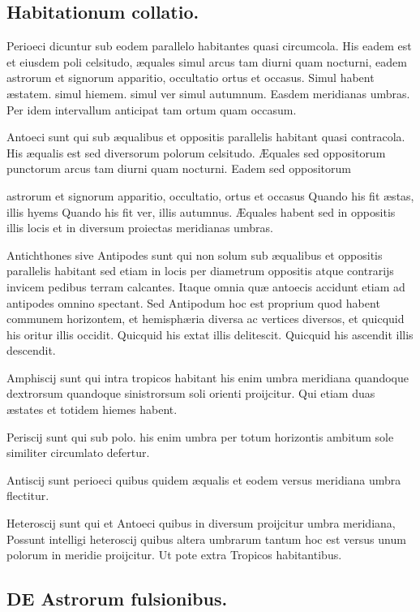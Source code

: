 \documentclass[11pt,a4paper]{article}
\begin{document}
\subsection*{Habitationum collatio.}

Perioeci dicuntur sub eodem parallelo habitantes quasi circumcola. His eadem est et eiusdem poli celsitudo, æquales simul arcus tam diurni quam nocturni, eadem astrorum et signorum apparitio, occultatio ortus et occasus. Simul habent æstatem. simul hiemem. simul ver simul autumnum. Easdem meridianas umbras. Per idem intervallum anticipat tam ortum quam occasum.

Antoeci sunt qui sub æqualibus et oppositis parallelis habitant quasi contracola. His æqualis est sed diversorum polorum celsitudo. Æquales sed oppositorum punctorum arcus tam diurni quam nocturni. Eadem sed oppositorum

astrorum et signorum apparitio, occultatio, ortus et occasus Quando his fit æstas, illis hyems Quando his fit ver, illis autumnus. Æquales habent sed in oppositis illis locis et in diversum proiectas meridianas umbras.

Antichthones sive Antipodes sunt qui non solum sub æqualibus et oppositis parallelis habitant sed etiam in locis per diametrum oppositis atque contrarijs invicem pedibus terram calcantes. Itaque omnia quæ antoecis accidunt etiam ad antipodes omnino spectant. Sed Antipodum hoc est proprium quod habent communem horizontem, et hemisphæria diversa ac vertices diversos, et quicquid his oritur illis occidit. Quicquid his extat illis delitescit. Quicquid his ascendit illis descendit.

Amphiscij sunt qui intra tropicos habitant his enim umbra meridiana quandoque dextrorsum quandoque sinistrorsum soli orienti proijcitur. Qui etiam duas æstates et totidem hiemes habent.

Periscij sunt qui sub polo. his enim umbra per totum horizontis ambitum sole similiter circumlato defertur.

Antiscij sunt perioeci quibus quidem æqualis et eodem versus meridiana umbra flectitur.

Heteroscij sunt qui et Antoeci quibus in diversum proijcitur umbra meridiana, Possunt intelligi heteroscij quibus altera umbrarum tantum hoc est versus unum polorum in meridie proijcitur. Ut pote extra Tropicos habitantibus.

\subsection*{DE Astrorum fulsionibus.}
\end{document}
